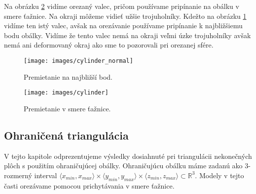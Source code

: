 Na obrázku \ref{obr:cylinder} vidíme orezaný valec, pričom používame
pripínanie na obálku v smere ťažnice. Na okraji môžeme vidieť užšie trojuholníky. 
Kdežto na obrázku \ref{obr:cylinder_normal} vidíme ten istý valec, 
avšak na orezávanie používame pripínanie k najbližšiemu bodu obálky.
Vidíme že tento valec nemá na okraji veľmi úzke trojuholníky avšak 
nemá ani deformovaný okraj ako sme to pozorovali pri orezanej sfére.

\begin{figure}
    \centerline{\texttt{[image: images/cylinder\_normal]}}
    \caption[Ohraničená triangulácia valca -- premietanie na najbližší bod]
    {Premietanie na najbližší bod.}
    \label{obr:cylinder_normal}
\end{figure}

\begin{figure}
    \centerline{\texttt{[image: images/cylinder]}}
    \caption[Ohraničená triangulácia valca -- premietanie v smere ťažnice]
    {Premietanie v smere ťažnice.}
    \label{obr:cylinder}
\end{figure}


\subsection{Ohraničená triangulácia}

V tejto kapitole odprezentujeme výsledky dosiahnuté pri triangulácii nekonečných plôch s použitím 
ohraničujúcej obálky. Ohraničujúcu obálku máme zadanú ako $3$-rozmerný interval 
$\langle x_{min}, x_{max}\rangle
\times \langle y_{min}, y_{max}\rangle \times \langle z_{min}, z_{max}\rangle \subset \mathbb{R}^3.$ 
Modely v tejto časti orezávame pomocou prichytávania v smere ťažnice.

